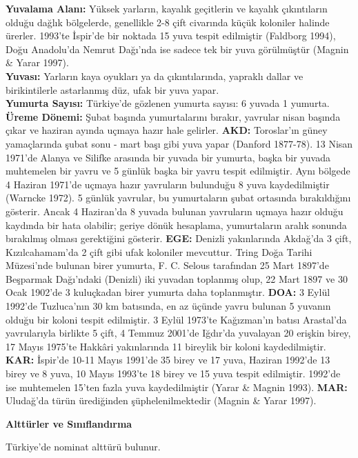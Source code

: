 \documentclass[
  letterpaper,
  DIV=11,
  numbers=noendperiod]{scrreprt}
\begin{document}
\textbf{Yuvalama Alanı:} Yüksek yarların, kayalık geçitlerin ve kayalık
çıkıntıların olduğu dağlık bölgelerde, genellikle 2-8 çift civarında
küçük koloniler halinde ürerler. 1993'te İspir'de bir noktada 15 yuva
tespit edilmiştir (Faldborg 1994), Doğu Anadolu'da Nemrut Dağı'nda ise
sadece tek bir yuva görülmüştür (Magnin \& Yarar 1997).\\
\textbf{Yuvası:} Yarların kaya oyukları ya da çıkıntılarında, yapraklı
dallar ve birikintilerle astarlanmış düz, ufak bir yuva yapar.\\
\textbf{Yumurta Sayısı:} Türkiye'de gözlenen yumurta sayısı: 6 yuvada 1
yumurta.\\
\textbf{Üreme Dönemi:} Şubat başında yumurtalarını bırakır, yavrular
nisan başında çıkar ve haziran ayında uçmaya hazır hale gelirler.
\textbf{AKD:} Toroslar'ın güney yamaçlarında şubat sonu - mart başı gibi
yuva yapar (Danford 1877-78). 13 Nisan 1971'de Alanya ve Silifke
arasında bir yuvada bir yumurta, başka bir yuvada muhtemelen bir yavru
ve 5 günlük başka bir yavru tespit edilmiştir. Aynı bölgede 4 Haziran
1971'de uçmaya hazır yavruların bulunduğu 8 yuva kaydedilmiştir (Warncke
1972). 5 günlük yavrular, bu yumurtaların şubat ortasında bırakıldığını
gösterir. Ancak 4 Haziran'da 8 yuvada bulunan yavruların uçmaya hazır
olduğu kaydında bir hata olabilir; geriye dönük hesaplama, yumurtaların
aralık sonunda bırakılmış olması gerektiğini gösterir. \textbf{EGE:}
Denizli yakınlarında Akdağ'da 3 çift, Kızılcahamam'da 2 çift gibi ufak
koloniler mevcuttur. Tring Doğa Tarihi Müzesi'nde bulunan birer yumurta,
F. C. Selous tarafından 25 Mart 1897'de Beşparmak Dağı'ndaki (Denizli)
iki yuvadan toplanmış olup, 22 Mart 1897 ve 30 Ocak 1902'de 3 kuluçkadan
birer yumurta daha toplanmıştır. \textbf{DOA:} 3 Eylül 1992'de
Tuzluca'nın 30 km batısında, en az üçünde yavru bulunan 5 yuvanın olduğu
bir koloni tespit edilmiştir. 3 Eylül 1973'te Kağızman'ın batısı
Arastal'da yavrularıyla birlikte 5 çift, 4 Temmuz 2001'de Iğdır'da
yuvalayan 20 erişkin birey, 17 Mayıs 1975'te Hakkâri yakınlarında 11
bireylik bir koloni kaydedilmiştir. \textbf{KAR:} İspir'de 10-11 Mayıs
1991'de 35 birey ve 17 yuva, Haziran 1992'de 13 birey ve 8 yuva, 10
Mayıs 1993'te 18 birey ve 15 yuva tespit edilmiştir. 1992'de ise
muhtemelen 15'ten fazla yuva kaydedilmiştir (Yarar \& Magnin 1993).
\textbf{MAR:} Uludağ'da türün ürediğinden şüphelenilmektedir (Magnin \&
Yarar 1997).

\textbf{Alttürler ve Sınıflandırma}

Türkiye'de nominat alttürü bulunur.
\end{document}
